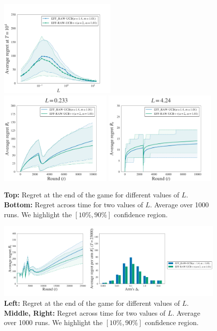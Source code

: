 \begin{figure}[ht]
\centering
\includegraphics[clip, width= 0.51\textwidth]{3Rested/fig/fig1A_pp.pdf}
\includegraphics[clip, width= 0.49\textwidth]{3Rested/fig/fig1B_pp.pdf}
\includegraphics[clip, width= 0.49\textwidth]{3Rested/fig/fig1C_pp.pdf}
\caption{\textbf{Top:} Regret at the end of the game for different values of $L$. \textbf{Bottom:} Regret across time for two values of $L$. Average over 1000 runs. We highlight the $\left[10\%, 90\%\right]$ confidence region.}
\label{fig:rested-pp1}
\end{figure}


\begin{figure}[ht]
\centering
\includegraphics[width = 0.99 \textwidth]{3Rested/fig/fig2_pp.pdf}
\caption{\textbf{Left:} Regret at the end of the game for different values of $L$. \textbf{Middle, Right:} Regret across time for two values of $L$. Average over 1000 runs. We highlight the $\left[10\%, 90\%\right]$ confidence region.}
\label{fig:rested-pp2}
\end{figure}

